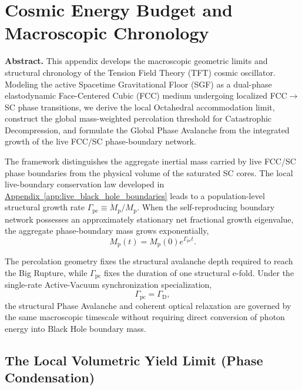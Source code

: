 \chapter{Cosmic Energy Budget and Macroscopic Chronology}
\label{app:cosmic_energy_budget_and_chronology}

\noindent\textbf{Abstract.}
This appendix develops the macroscopic geometric limits and structural
chronology of the Tension Field Theory (TFT) cosmic oscillator. Modeling the
active Spacetime Gravitational Floor (SGF) as a dual-phase elastodynamic
Face-Centered Cubic (FCC) medium undergoing localized FCC$\rightarrow$SC phase
transitions, we derive the local Octahedral accommodation limit, construct the
global mass-weighted percolation threshold for Catastrophic Decompression, and
formulate the Global Phase Avalanche from the integrated growth of the live
FCC/SC phase-boundary network.

The framework distinguishes the aggregate inertial mass carried by live
FCC/SC phase boundaries from the physical volume of the saturated SC cores.
The local live-boundary conservation law developed in \hyperref[app:live_black_hole_boundaries]{Appendix~\ref*{app:live_black_hole_boundaries}} leads to a
population-level structural growth rate
\(\Gamma_{\mathrm{pc}}\equiv\dot M_{\mathrm p}/M_{\mathrm p}\).
When the self-reproducing boundary network possesses an approximately
stationary net fractional growth eigenvalue, the aggregate phase-boundary mass
grows exponentially,
\[
    M_{\mathrm p}(t)
    =
    M_{\mathrm p}(0)
    e^{\Gamma_{\mathrm{pc}}t}.
\]

The percolation geometry fixes the structural avalanche depth required to
reach the Big Rupture, while \(\Gamma_{\mathrm{pc}}\) fixes the duration of one
structural e-fold. Under the single-rate Active-Vacuum synchronization
specialization,
\[
    \Gamma_{\mathrm{pc}}
    =
    \Gamma_{\mathrm D},
\]
the structural Phase Avalanche and coherent optical relaxation are governed
by the same macroscopic timescale without requiring direct conversion of
photon energy into Black Hole boundary mass.


\section{The Local Volumetric Yield Limit (Phase Condensation)}

